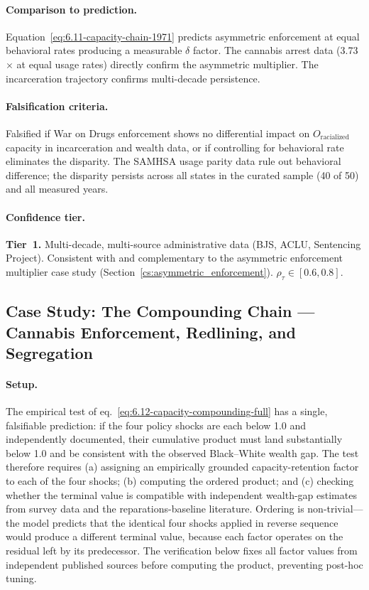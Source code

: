 \paragraph{Comparison to prediction.}
Equation~\ref{eq:6.11-capacity-chain-1971} predicts asymmetric enforcement at equal behavioral rates producing a measurable $\delta$ factor. The cannabis arrest data (3.73$\times$ at equal usage rates) directly confirm the asymmetric multiplier. The incarceration trajectory confirms multi-decade persistence.

\paragraph{Falsification criteria.}
Falsified if War on Drugs enforcement shows no differential impact on $O_{\text{racialized}}$ capacity in incarceration and wealth data, or if controlling for behavioral rate eliminates the disparity. The SAMHSA usage parity data rule out behavioral difference; the disparity persists across all states in the curated sample (40 of 50) and all measured years.

\paragraph{Confidence tier.}
\textbf{Tier~1.} Multi-decade, multi-source administrative data (BJS, ACLU, Sentencing Project). Consistent with and complementary to the asymmetric enforcement multiplier case study (Section~\ref{cs:asymmetric_enforcement}). $\rho_\tau \in [0.6, 0.8]$.

\subsection*{Case Study: The Compounding Chain --- Cannabis Enforcement, Redlining, and Segregation}
\label{cs:cannabis_redlining}

\paragraph{Setup.}
The empirical test of eq.~\ref{eq:6.12-capacity-compounding-full} has a single, falsifiable prediction: if the four policy shocks are each below 1.0 and independently documented, their cumulative product must land substantially below 1.0 and be consistent with the observed Black--White wealth gap. The test therefore requires (a) assigning an empirically grounded capacity-retention factor to each of the four shocks; (b) computing the ordered product; and (c) checking whether the terminal value is compatible with independent wealth-gap estimates from survey data and the reparations-baseline literature. Ordering is non-trivial---the model predicts that the identical four shocks applied in reverse sequence would produce a different terminal value, because each factor operates on the residual left by its predecessor. The verification below fixes all factor values from independent published sources before computing the product, preventing post-hoc tuning.


